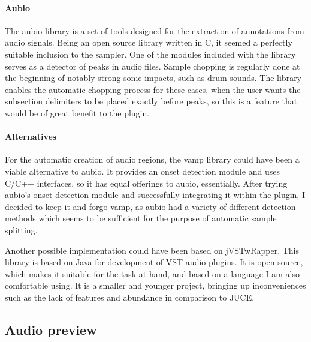\documentclass[12pt, a4paper, hidelinks]{article}
\begin{document}
	
	\paragraph{Aubio\\}
	The aubio library is a set of tools designed for the extraction of annotations from audio signals\cite{aubio}. Being an open source library written in C, it seemed a perfectly suitable inclusion to the sampler. One of the modules included with the library serves as a detector of peaks in audio files. Sample chopping is regularly done at the beginning of notably strong sonic impacts, such as drum sounds. The library enables the automatic chopping process for these cases, when the user wants the subsection delimiters to be placed exactly before peaks, so this is a feature that would be of great benefit to the plugin.
	
	\paragraph{Alternatives\\}
	For the automatic creation of audio regions, the vamp\cite{vamp} library could have been a viable alternative to aubio\cite{aubio}. It provides an onset detection module\cite{vamponset} and uses C/C++ interfaces, so it has equal offerings to aubio, essentially. After trying aubio's onset detection module and successfully integrating it within the plugin, I decided to keep it and forgo vamp, as aubio had a variety of different detection methods which seems to be sufficient for the purpose of automatic sample splitting.\par	
	Another possible implementation could have been based on jVSTwRapper\cite{jVSTwRapper}. This library is based on Java for development of VST audio plugins. It is open source, which makes it suitable for the task at hand, and based on a language I am also comfortable using. It is a smaller and younger project, bringing up inconveniences such as the lack of features and abundance in comparison to JUCE. 
	
	
	\newpage	
	\subsection{Audio preview}
	
\end{document}
